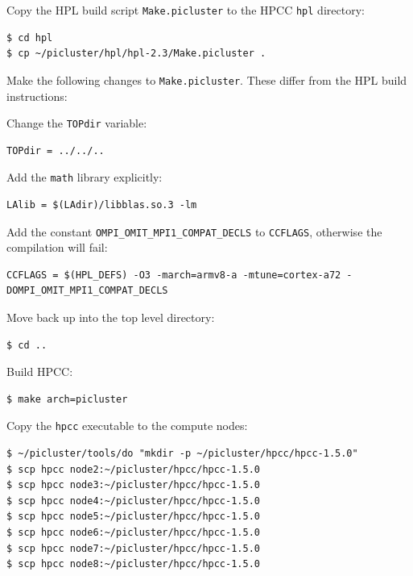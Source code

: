 \documentclass{report}
\begin{document}
Copy the HPL build script \verb|Make.picluster| to the HPCC \verb|hpl| directory:

\lstset{style=type}
\begin{lstlisting}
$ cd hpl
$ cp ~/picluster/hpl/hpl-2.3/Make.picluster .
\end{lstlisting}

Make the following changes to \verb|Make.picluster|. These differ from the HPL build instructions:

Change the \verb|TOPdir| variable:

\lstset{style=hack}
\begin{lstlisting}[caption=Make.picluster]
TOPdir = ../../..
\end{lstlisting}

Add the \verb|math| library explicitly:

\lstset{style=hack}
\begin{lstlisting}[caption=Make.picluster]
LAlib = $(LAdir)/libblas.so.3 -lm
\end{lstlisting}

Add the constant \verb|OMPI_OMIT_MPI1_COMPAT_DECLS| to \verb|CCFLAGS|, otherwise the compilation will fail:

\lstset{style=hack}
\begin{lstlisting}[caption=Make.picluster]
CCFLAGS = $(HPL_DEFS) -O3 -march=armv8-a -mtune=cortex-a72 -DOMPI_OMIT_MPI1_COMPAT_DECLS
\end{lstlisting}

Move back up into the top level directory:

\lstset{style=type}
\begin{lstlisting}
$ cd ..
\end{lstlisting}

Build HPCC:

\lstset{style=type}
\begin{lstlisting}
$ make arch=picluster
\end{lstlisting}

Copy the \verb|hpcc| executable to the compute nodes:

\lstset{style=type}
\begin{lstlisting}
$ ~/picluster/tools/do "mkdir -p ~/picluster/hpcc/hpcc-1.5.0"
$ scp hpcc node2:~/picluster/hpcc/hpcc-1.5.0
$ scp hpcc node3:~/picluster/hpcc/hpcc-1.5.0
$ scp hpcc node4:~/picluster/hpcc/hpcc-1.5.0
$ scp hpcc node5:~/picluster/hpcc/hpcc-1.5.0
$ scp hpcc node6:~/picluster/hpcc/hpcc-1.5.0
$ scp hpcc node7:~/picluster/hpcc/hpcc-1.5.0
$ scp hpcc node8:~/picluster/hpcc/hpcc-1.5.0
\end{lstlisting}
\end{document}

